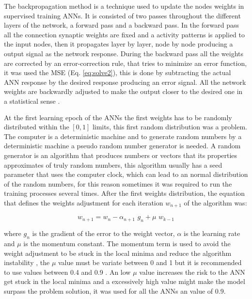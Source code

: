 The backpropagation method is a technique used to update the nodes weights in supervised training ANNs. It is consisted of two passes throughout the different layers of the network, a forward pass and a backward pass. In the forward pass all the connection synaptic weights are fixed and a activity patterns is applied to the input nodes, then it propagates layer by layer, node by node producing a output signal as the network response. During the backward pass all the weights are corrected by an error-correction rule, that tries to minimize an error function, it was used the MSE (Eq. \ref{eq:solve2}), this is done by subtracting the actual ANN response by the desired response producing an error signal. All the network weights are backwardly adjusted to make the output closer to the desired one in a statistical sense \cite{dao2002performance}.

At the first learning epoch of the ANNs the first weights has to be randomly distributed within the $[0, 1]$ limits, this first random distribution was a problem. The computer is a deterministic machine and to generate random numbers by a deterministic machine a pseudo random number generator is needed. A random generator is an algorithm that produces numbers or vectors that its properties approximates of truly random numbers, this algorithm usually has a seed parameter that uses the computer clock, which can lead to an normal distribution of the random numbers, for this reason sometimes it was required to run the training processes several times. After the first weights distribution, the equation that defines the weights adjustment for each iteration $w_{n + 1}$ of the algorithm was:

\begin{equation}
 \label{eq:solve17}
w_{n+1} = w_n - \alpha_{n + 1} \,\, g_n + \mu \,\, w_{k - 1}
\end{equation}

where $g_n$ is the gradient of the error to the weight vector, $\alpha$ is the learning rate and $\mu$ is the momentum constant. The momentum term is used to avoid the weight adjustment to be stuck in the local minima and reduce the algorithm instability \cite{haykin2004comprehensive}, the $\mu$ value must be variate between 0 and 1 but it is recommended to use values between 0.4 and 0.9 \cite{wythoff1993backpropagation}.
An low $\mu$ value increases the risk to the ANN get stuck in the local minima and a excessively high value might make the model surpass the problem solution, it was used for all the ANNs an value of 0.9.

